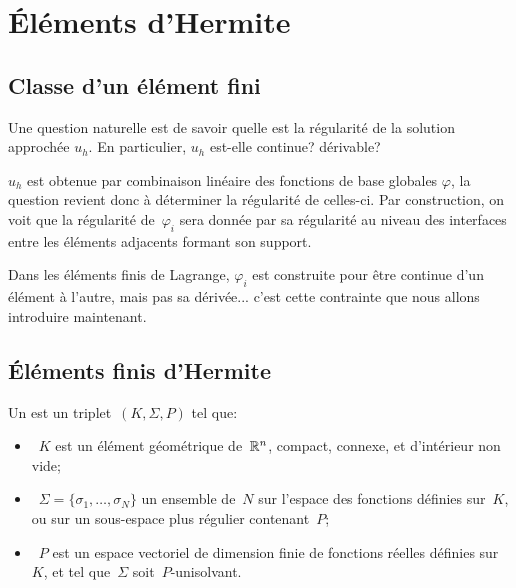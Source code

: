 \medskip
\section{Éléments d'Hermite}

\medskip
\subsection{Classe d'un élément fini}

Une question naturelle est de savoir quelle est la régularité de la solution approchée
$u_h$. En particulier, $u_h$ est-elle continue? dérivable?

$u_h$ est obtenue par combinaison linéaire des fonctions de base globales
$\varphi$, la question revient donc à déterminer la régularité de celles-ci.
Par construction, on voit que la régularité de~$\varphi_i$ sera donnée par sa
régularité au niveau des interfaces entre les éléments adjacents formant
son support.

Dans les éléments finis de Lagrange, $\varphi_i$ est construite pour être continue
d'un élément à l'autre, mais pas sa dérivée... c'est cette contrainte que
nous allons introduire maintenant.


\medskip
\subsection{Éléments finis d'Hermite}

\begin{definition}
Un  est un
triplet~$(K, \Sigma, P)$ tel que:
\begin{itemize}
\item~$K$ est un élément géométrique de~$\mathbb R^n$, compact, connexe, et d'intérieur
	non vide;
\item~$\Sigma=\{\sigma_1,\ldots, \sigma_N\}$ un ensemble de~$N$ 
	sur l'espace des fonctions définies sur~$K$, ou sur un sous-espace plus régulier contenant~$P$;
\item~$P$ est un espace vectoriel de dimension finie de fonctions réelles définies sur~$K$, et tel
	que~$\Sigma$ soit~$P$-unisolvant.
\end{itemize}
\end{definition}

